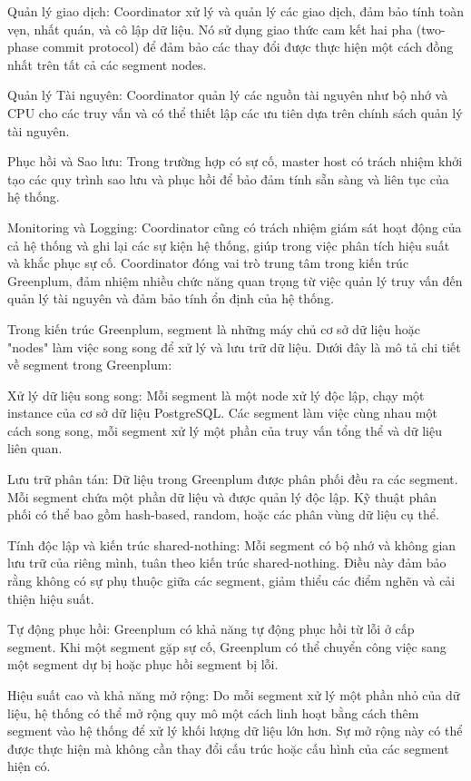 \documentclass{article}[14pt]
\begin{document}
{{Quản lý giao dịch: Coordinator xử lý và quản lý các giao dịch, đảm bảo tính toàn vẹn, nhất quán, và cô lập dữ liệu. Nó sử dụng giao thức cam kết hai pha (two-phase commit protocol) để đảm bảo các thay đổi được thực hiện một cách đồng nhất trên tất cả các segment nodes.

Quản lý Tài nguyên: Coordinator quản lý các nguồn tài nguyên như bộ nhớ và CPU cho các truy vấn và có thể thiết lập các ưu tiên dựa trên chính sách quản lý tài nguyên.

Phục hồi và Sao lưu: Trong trường hợp có sự cố, master host có trách nhiệm khởi tạo các quy trình sao lưu và phục hồi để bảo đảm tính sẵn sàng và liên tục của hệ thống.

Monitoring và Logging: Coordinator cũng có trách nhiệm giám sát hoạt động của cả hệ thống và ghi lại các sự kiện hệ thống, giúp trong việc phân tích hiệu suất và khắc phục sự cố. Coordinator đóng vai trò trung tâm trong kiến trúc Greenplum, đảm nhiệm nhiều chức năng quan trọng từ việc quản lý truy vấn đến quản lý tài nguyên và đảm bảo tính ổn định của hệ thống.

Trong kiến trúc Greenplum, segment là những máy chủ cơ sở dữ liệu hoặc
"nodes" làm việc song song để xử lý và lưu trữ dữ liệu. Dưới đây là mô tả chi tiết về segment trong Greenplum:

Xử lý dữ liệu song song: Mỗi segment là một node xử lý độc lập, chạy một instance của cơ sở dữ liệu PostgreSQL. Các segment làm việc cùng nhau một cách song song, mỗi segment xử lý một phần của truy vấn tổng thể và dữ liệu liên quan.

Lưu trữ phân tán: Dữ liệu trong Greenplum được phân phối đều ra các segment. Mỗi segment chứa một phần dữ liệu và được quản lý độc lập.
Kỹ thuật phân phối có thể bao gồm hash-based, random, hoặc các phân vùng
dữ liệu cụ thể. 

Tính độc lập và kiến trúc shared-nothing:
Mỗi segment có bộ nhớ và không gian lưu trữ của riêng mình, tuân theo kiến trúc shared-nothing. Điều này đảm bảo rằng không có sự phụ thuộc giữa các segment, giảm thiểu các điểm nghẽn và cải thiện hiệu suất.

Tự động phục hồi: Greenplum có khả năng tự động phục hồi từ lỗi ở cấp segment. Khi một segment gặp sự cố, Greenplum có thể chuyển công việc sang một segment dự bị hoặc phục hồi segment bị lỗi.

Hiệu suất cao và khả năng mở rộng: Do mỗi segment xử lý một phần nhỏ của dữ liệu, hệ thống có thể mở rộng quy mô một cách linh hoạt bằng cách thêm segment vào hệ thống để xử lý khối lượng dữ liệu lớn hơn.
Sự mở rộng này có thể được thực hiện mà không cần thay đổi cấu trúc hoặc
cấu hình của các segment hiện có.

}}
\end{document}
